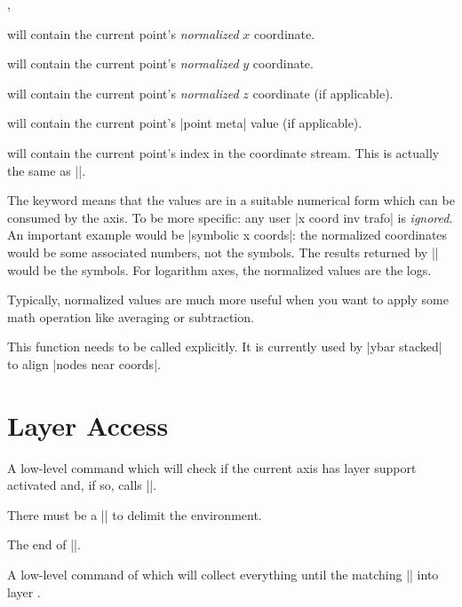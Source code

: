 \begin{commandlist}{\pgfplotspointgetcoordinates,\pgfplotspointgetcoordinates{}}
\begin{command}{\pgfplotspointgetnormalizedcoordinates}
     will contain the current point's
    \emph{normalized} $x$ coordinate.

     will contain the current point's
    \emph{normalized} $y$ coordinate.

     will contain the current point's
    \emph{normalized} $z$ coordinate (if applicable).

     will contain the current point's
    |point meta| value (if applicable).

     will contain the current point's index in
    the coordinate stream. This is actually the same as |\coordindex|.

    The keyword  means that the values are in a
    suitable numerical form which can be consumed by the axis. To be more
    specific: any user |x coord inv trafo| is \emph{ignored}. An important
    example would be |symbolic x coords|: the normalized coordinates would be
    some associated numbers, not the symbols. The results returned by
    |\pgfplotspointgetcoordinates| would be the symbols. For logarithm axes,
    the normalized values are the logs.

    Typically, normalized values are much more useful when you want to apply
    some math operation like averaging or subtraction.

    This function needs to be called explicitly. It is currently used by
    |ybar stacked| to align |nodes near coords|.
\end{command}


\section{Layer Access}

\begin{command}{\pgfplotsonlayer{}}
    A low-level command which will check if the current axis has layer support
    activated and, if so, calls |\pgfonlayer|.

    There must be a |\endpgfplotsonlayer| to delimit the environment.
\end{command}

\begin{command}{\endpgfplotsonlayer}
    The end of |\pgfplotsonlayer|.
\end{command}

\begin{command}{\pgfonlayer{}}
    A low-level command of \PGF{} which will collect everything until the
    matching |\endpgfonlayer| into layer .


\end{command}
\end{commandlist}
